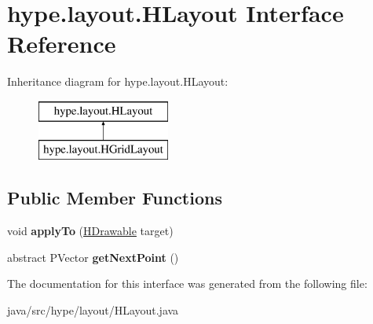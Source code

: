 \hypertarget{interfacehype_1_1layout_1_1_h_layout}{\section{hype.\-layout.\-H\-Layout Interface Reference}
\label{interfacehype_1_1layout_1_1_h_layout}
}
Inheritance diagram for hype.\-layout.\-H\-Layout\-:\begin{figure}[H]
\begin{center}
\leavevmode
\includegraphics[height=2.000000cm]{interfacehype_1_1layout_1_1_h_layout}
\end{center}
\end{figure}
\subsection*{Public Member Functions}
\begin{DoxyCompactItemize}
\item 
\hypertarget{interfacehype_1_1layout_1_1_h_layout_ac608caf6e974ff4aa535f9ba1816a5d2}{void {\bfseries apply\-To} (\hyperlink{classhype_1_1drawable_1_1_h_drawable}{H\-Drawable} target)}\label{interfacehype_1_1layout_1_1_h_layout_ac608caf6e974ff4aa535f9ba1816a5d2}

\item 
\hypertarget{interfacehype_1_1layout_1_1_h_layout_a1386bc465bb8c78aa23f768ec321faaa}{abstract P\-Vector {\bfseries get\-Next\-Point} ()}\label{interfacehype_1_1layout_1_1_h_layout_a1386bc465bb8c78aa23f768ec321faaa}

\end{DoxyCompactItemize}


The documentation for this interface was generated from the following file\-:\begin{DoxyCompactItemize}
\item 
java/src/hype/layout/H\-Layout.\-java\end{DoxyCompactItemize}
